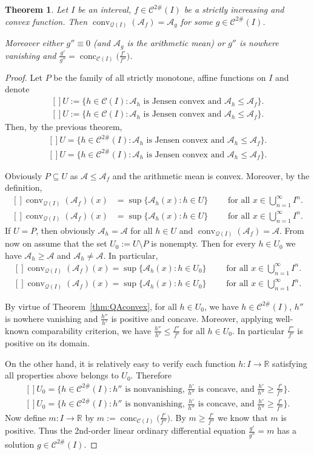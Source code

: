 \documentclass[12pt,oneside]{amsart}
\newtheorem{thm}{Theorem}[section]
\theoremstyle{definition}
\numberwithin{equation}{section}
\def\Eq#1#2{\ifthenelse{\equal{#1}{*}}
  {\begin{equation*}\begin{aligned}[]#2\end{aligned}\end{equation*}}
  {\begin{equation}\begin{aligned}[]\label{#1}#2\end{aligned}\end{equation}}}
\def\A{\mathscr{A}}
\def\Cts{\mathcal{C}^{2\#}}
\def\calQ{\mathcal{Q}}
\newcommand\R{\mathbb{R}}
\newcommand{\QA}[1]{\A_{#1}}
\DeclareMathOperator{\conv}{conv}
\DeclareMathOperator{\conc}{conc}
\begin{document}
\begin{thm}
Let $I$ be an interval, $f \in \Cts(I)$ be a strictly increasing and convex function. Then $\conv_{\calQ(I)}(\QA{f})=\QA{g}$ for some $g \in \Cts(I)$. 

Moreover either $g''\equiv 0$ (and $\QA{g}$ is the arithmetic mean) or $g''$ is nowhere vanishing and $\frac{g'}{g''}=\conc_{\mathcal{C}(I)}\big(\frac{f'}{f''}\big)$.
\end{thm}

\begin{proof}
Let $P$ be the family of all strictly monotone, affine functions on $I$ and
denote 
\Eq{*}{
U:=\{ h \in \mathcal{C}(I) \colon \QA{h}\text{ is Jensen convex and }\QA{h}\le\QA{f}\}.
}
Then, by the previous theorem,
\Eq{*}{
U=\{ h \in \Cts(I) \colon \QA{h}\text{ is Jensen convex and }\QA{h}\le\QA{f}\}.
}


Obviously $P \subseteq U$ as $\A \le \QA{f}$ and the arithmetic mean is convex. Moreover, by the definition,
\Eq{*}{
\conv_{\calQ(I)}(\QA{f})(x)
&=\sup \{\QA{h}(x) \colon h \in U\} \qquad \text{ for all }x \in \bigcup_{n=1}^\infty I^n.
}
If $U=P$, then obviously $\QA{h}=\A$ for all $h \in U$ and $\conv_{\calQ(I)}(\QA{f})=\A$.
From now on assume that the set $U_0:=U \setminus P$ is nonempty. Then for every $h \in U_0$ we have $\QA{h} \ge \A$ and $\QA{h} \neq \A$. In particular,
\Eq{IneqU0}{
\conv_{\calQ(I)}(\QA{f})(x)
=\sup \{\QA{h}(x) \colon h \in U_0\} \qquad \text{ for all }x \in \bigcup_{n=1}^\infty I^n.
}

By virtue of Theorem~\ref{thm:QAconvex}, for all $h \in U_0$, we have $h \in \Cts(I)$, $h''$ is nowhere vanishing and $\frac{h''}{h'}$ is positive and concave. Moreover, applying well-known comparability criterion, we have $\frac{h''}{h'} \le \frac{f''}{f'}$ for all $h \in U_0$. In particular $\frac{f''}{f'}$ is positive on its domain.

On the other hand, it is relatively easy to verify each function $h\colon I \to \R$ satisfying all properties above belongs to $U_0$. Therefore
\Eq{*}{
U_0=\big\{h \in \Cts(I) \colon h''\text{ is nonvanishing, }\tfrac{h'}{h''}\text{ is concave, and }\tfrac{h'}{h''} \ge \tfrac{f'}{f''}\big\}.
}
Now define $m\colon I \to \R$ by $m:=\conc_{\mathcal{C}(I)}\big(\frac{f'}{f''}\big)$. By $m\ge \frac{f'}{f''}$ we know that $m$ is  positive. Thus the 2nd-order linear ordinary differential equation $\frac{g'}{g''}=m$ has a solution $g \in \Cts(I)$.



\end{proof}
\end{document}
